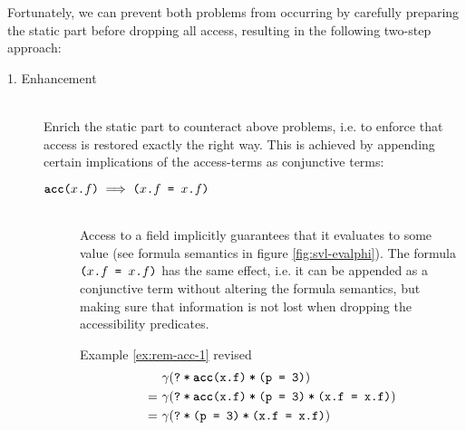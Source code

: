 \begin{proofatend}
    Fortunately, we can prevent both problems from occurring by carefully preparing the static part before dropping all access, resulting in the following two-step approach:
    
    \begin{description}
        \item[1. Enhancement]~\\
        Enrich the static part to counteract above problems, i.e. to enforce that access is restored exactly the right way.
        This is achieved by appending certain implications of the access-terms as conjunctive terms:
        \begin{description}
            \item [$\textup{\texttt{\textbf{acc}($x$.$f$)}} \implies \textup{\texttt{(\textup{\texttt{$x$.$f$}} = \textup{\texttt{$x$.$f$}})}}$]~\\
            Access to a field implicitly guarantees that it evaluates to some value (see formula semantics in figure \ref{fig:svl-evalphi}).
            The formula $\textup{\texttt{(\textup{\texttt{$x$.$f$}} = \textup{\texttt{$x$.$f$}})}}$ has the same effect, i.e. it can be appended as a conjunctive term without altering the formula semantics, but making sure that information is not lost when dropping the accessibility predicates.
            \begin{example}{Example \ref{ex:rem-acc-1} revised}\label{ex:rem-acc-2}~
                \begin{align*}
                &\gamma(\textup{\texttt{\textup{\texttt{?}}\:*\:\ensuremath{\textup{\texttt{\textup{\texttt{\textbf{acc}(x.f)}}\:*\:\textup{\texttt{(p = 3)}}}}}}}) \\
                =~
                &\gamma(\textup{\texttt{\textup{\texttt{?}}\:*\:\ensuremath{\textup{\texttt{\textup{\texttt{\textup{\texttt{\textbf{acc}(x.f)}}\:*\:\textup{\texttt{(p = 3)}}}}\:*\:\textup{\texttt{(x.f = x.f)}}}}}}})\\
                =~
                &\gamma(\textup{\texttt{\textup{\texttt{?}}\:*\:\ensuremath{\textup{\texttt{\textup{\texttt{(p = 3)}}\:*\:\textup{\texttt{(x.f = x.f)}}}}}}})
                \end{align*}
            \end{example}
            

\end{description}
\end{description}
\end{proofatend}
